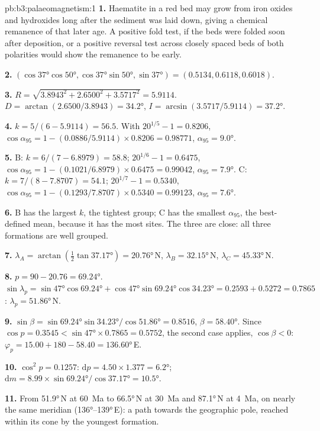 \begin{solution}{pb:b3:palaeomagnetism:1}
\textbf{1.} Haematite in a red bed may grow from iron oxides and hydroxides
long after the sediment was laid down, giving a chemical remanence of that
later age. A positive fold test, if the beds were folded soon after
deposition, or a positive reversal test across closely spaced beds of both
polarities would show the remanence to be early.

\textbf{2.} $(\cos\ang{37}\cos\ang{50}, \cos\ang{37}\sin\ang{50}, \sin\ang{37})
= (0.5134, 0.6118, 0.6018)$.

\textbf{3.} $R = \sqrt{3.8943^2 + 2.6500^2 + 3.5717^2} = 5.9114$. $D =
\arctan(2.6500/3.8943) = \ang{34.2}$, $I = \arcsin(3.5717/5.9114) = \ang{37.2}$.

\textbf{4.} $k = 5/(6 - 5.9114) = 56.5$. With $20^{1/5} - 1 = 0.8206$,
$\cos\alpha_{95} = 1 - (0.0886/5.9114)\times0.8206 = 0.98771$, $\alpha_{95} =
\ang{9.0}$.

\textbf{5.} B: $k = 6/(7 - 6.8979) = 58.8$; $20^{1/6} - 1 = 0.6475$,
$\cos\alpha_{95} = 1 - (0.1021/6.8979)\times0.6475 = 0.99042$, $\alpha_{95} =
\ang{7.9}$. C: $k = 7/(8 - 7.8707) = 54.1$; $20^{1/7} - 1 = 0.5340$,
$\cos\alpha_{95} = 1 - (0.1293/7.8707)\times0.5340 = 0.99123$, $\alpha_{95} =
\ang{7.6}$.

\textbf{6.} B has the largest $k$, the tightest group; C has the smallest
$\alpha_{95}$, the best-defined mean, because it has the most sites. The three
are close: all three formations are well grouped.

\textbf{7.} $\lambda_A = \arctan(\tfrac12\tan\ang{37.17}) = \ang{20.76}$\,N,
$\lambda_B = \ang{32.15}$\,N, $\lambda_C = \ang{45.33}$\,N.

\textbf{8.} $p = 90 - 20.76 = \ang{69.24}$. $\sin\lambda_p =
\sin\ang{47}\cos\ang{69.24} + \cos\ang{47}\sin\ang{69.24}\cos\ang{34.23} =
0.2593 + 0.5272 = 0.7865$: $\lambda_p = \ang{51.86}$\,N.

\textbf{9.} $\sin\beta = \sin\ang{69.24}\sin\ang{34.23}/\cos\ang{51.86} =
0.8516$, $\beta = \ang{58.40}$. Since $\cos p = 0.3545 < \sin\ang{47}\times
0.7865 = 0.5752$, the second case applies, $\cos\beta < 0$:
$\varphi_p = 15.00 + 180 - 58.40 = \ang{136.60}$\,E.

\textbf{10.} $\cos^2p = 0.1257$: $\mathrm dp = 4.50\times1.377 = \ang{6.2}$;
$\mathrm dm = 8.99\times\sin\ang{69.24}/\cos\ang{37.17} = \ang{10.5}$.

\textbf{11.} From \ang{51.9}\,N at \qty{60}{Ma} to \ang{66.5}\,N at
\qty{30}{Ma} and \ang{87.1}\,N at \qty{4}{Ma}, on nearly the same meridian
(\ang{136}--\ang{139}\,E): a path towards the geographic pole, reached within
its cone by the youngest formation.


\end{solution}
